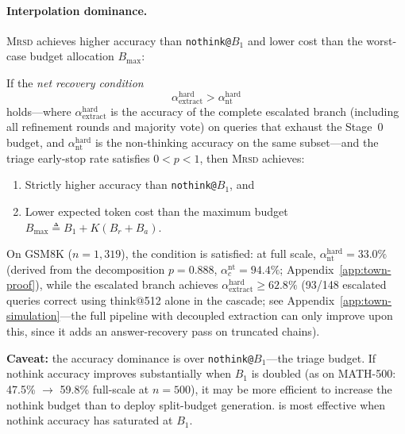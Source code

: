\paragraph{Interpolation dominance.}
\textsc{Mrsd} achieves higher accuracy than \texttt{nothink@}$B_1$ and
lower cost than the worst-case budget allocation $B_{\max}$:

\begin{theorem}
\label{thm:mrsd-pareto}
If the \emph{net recovery condition}
\begin{equation}
  \label{eq:net-recovery}
  \alpha_{\mathrm{extract}}^{\mathrm{hard}} > \alpha_{\mathrm{nt}}^{\mathrm{hard}}
\end{equation}
holds---where $\alpha_{\mathrm{extract}}^{\mathrm{hard}}$ is the
accuracy of the complete escalated branch (including all refinement rounds
and majority vote) on queries that exhaust the Stage~0 budget,
and $\alpha_{\mathrm{nt}}^{\mathrm{hard}}$ is the non-thinking
accuracy on the same subset---and the triage early-stop rate satisfies
$0 < p < 1$, then \textsc{Mrsd} achieves:
\begin{enumerate}[nosep,leftmargin=*]
  \item Strictly higher accuracy than \texttt{nothink@}$B_1$, and
  \item Lower expected token cost than the maximum budget
    $B_{\max} \triangleq B_1 + K(B_r + B_a)$.
\end{enumerate}
On GSM8K ($n{=}1{,}319$), the condition is satisfied:
at full scale, $\alpha_{\mathrm{nt}}^{\mathrm{hard}} = 33.0\%$
(derived from the decomposition $p = 0.888$,
$\alpha_c^{\mathrm{nt}} = 94.4\%$;
Appendix~\ref{app:town-proof}), while the escalated branch
achieves $\alpha_{\mathrm{extract}}^{\mathrm{hard}} \ge 62.8\%$
(93/148 escalated queries correct using think@512 alone in the
\town{} cascade; see Appendix~\ref{app:town-simulation}---the
full \method{} pipeline with decoupled extraction can only
improve upon this, since it adds an answer-recovery pass on
truncated chains).

\textbf{Caveat:} the accuracy dominance is over \texttt{nothink@}$B_1$---the triage budget.
If nothink accuracy improves substantially when $B_1$ is doubled
(as on MATH-500: 47.5\% $\to$ 59.8\% full-scale at $n{=}500$), it may be more efficient
to increase the nothink budget than to deploy split-budget generation.
\method{} is most effective when nothink accuracy has saturated at $B_1$.
\end{theorem}

